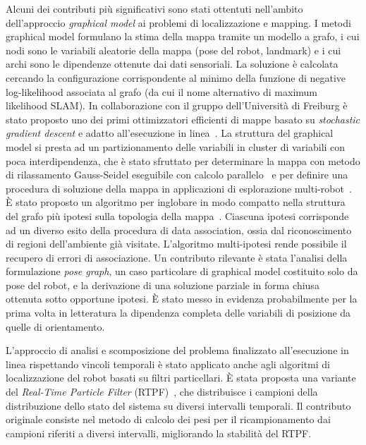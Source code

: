 \documentclass[11pt]{article}
\begin{document}
Alcuni dei contributi pi\`u significativi sono stati ottentuti nell'ambito dell'approccio \emph{graphical model} ai problemi di localizzazione e mapping. 
I metodi graphical model formulano la stima della mappa tramite un modello a grafo, i cui nodi sono le variabili aleatorie della mappa (pose del robot, landmark) e i cui archi sono le dipendenze ottenute dai dati sensoriali. 
La soluzione \`e calcolata cercando la configurazione corrispondente al minimo della funzione di negative log-likelihood associata al grafo (da cui il nome alternativo di maximum likelihood SLAM). 
In collaborazione con il gruppo dell'Universit\`a di Freiburg \`e stato proposto uno dei primi ottimizzatori efficienti di mappe basato su \emph{stochastic gradient descent} e adatto all'esecuzione in linea~\cite{grisetti2008icra,lodirizzini2009ras}. 
La struttura del graphical model si presta ad un partizionamento delle variabili in cluster di variabili con poca interdipendenza, che \`e stato sfruttato per determinare la mappa con metodo di rilassamento Gauss-Seidel eseguibile con calcolo parallelo~\cite{lodirizzini2009iros} e per definire una procedura di soluzione della mappa in applicazioni di esplorazione multi-robot~\cite{lodirizzini2010iros,lodirizzini2010graphbot}. 
\`E stato proposto un algoritmo per inglobare in modo compatto nella struttura del grafo pi\`u ipotesi sulla topologia della mappa~\cite{lodirizzini2011icra}. 
Ciascuna ipotesi corrisponde ad un diverso esito della procedura di data association, ossia dal riconoscimento di regioni dell'ambiente gi\`a visitate. 
L'algoritmo multi-ipotesi rende possibile il recupero di errori di associazione. 
Un contributo rilevante \`e stata l'analisi della formulazione \emph{pose graph}, un caso particolare di graphical model costituito solo da pose del robot, e la derivazione di una soluzione parziale in forma chiusa~\cite{lodirizzini2009ecmr,lodirizzini2009icar} ottenuta sotto opportune ipotesi. 
\`E stato messo in evidenza probabilmente per la prima volta in letteratura la dipendenza completa delle variabili di posizione da quelle di orientamento. 

L'approccio di analisi e scomposizione del problema finalizzato all'esecuzione in linea rispettando vincoli temporali \`e stato applicato anche agli algoritmi di localizzazione del robot basati su filtri particellari. 
\`E stata proposta una variante del \emph{Real-Time Particle Filter} (RTPF)~\cite{lodirizzini2007icinco,lodirizzini2007ecmr,lodirizzini2008improved}, che distribuisce i campioni della distribuzione dello stato del sistema su diversi intervalli temporali. 
Il contributo originale consiste nel metodo di calcolo dei pesi per il ricampionamento dai campioni riferiti a diversi intervalli, migliorando la stabilit\`a del RTPF. 
\end{document}
